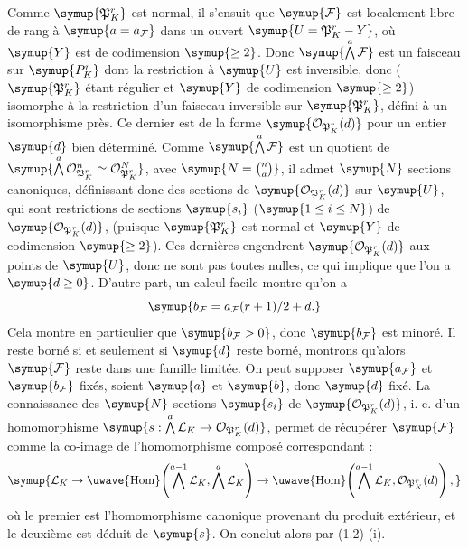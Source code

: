 Comme $\symup{\mathfrak P^r_K}$ est normal, il s'ensuit que $\symup{\mathcal F}$ est localement
libre de rang à $\symup{a=a_{\mathcal F}}$ dans un ouvert
$\symup{U=\mathfrak P^r_K-Y}$, où $\symup{Y}$ est de codimension $\symup{\geq2}$. Donc
$\symup{\mathop{\bigwedge}\limits^{a}\mathcal F}$ est un faisceau sur $\symup{P^r_K}$ dont la restriction
à $\symup{U}$ est inversible, donc ($\symup{\mathfrak P^r_K}$ étant régulier et $\symup{Y}$ de
codimension $\symup{\geq2}$) isomorphe à la restriction d'un faisceau inversible sur
$\symup{\mathfrak P^r_K}$, défini à un isomorphisme près. Ce dernier est de la forme
$\symup{\mathcal O_{\mathfrak P^r_K}(d)}$ pour un entier $\symup{d}$ bien déterminé. Comme
$\symup{\mathop{\bigwedge}\limits^{a}\mathcal F}$ est un quotient de
$\symup{\mathop{\bigwedge}\limits^{a}\mathcal O_{\mathfrak P^r_K}^{n}\simeq
\mathcal O_{\mathfrak P^r_K}^{N}}$, avec $\symup{N=\binom{n}{a}}$, il admet $\symup{N}$ sections
canoniques, définissant donc des sections de
$\symup{\mathcal O_{\mathfrak P^r_K}(d)}$ sur $\symup{U}$, qui sont restrictions de sections
$\symup{s_i}$ ($\symup{1\leq i\leq N}$) de $\symup{\mathcal O_{\mathfrak P^r_K}(d)}$, (puisque
$\symup{\mathfrak P^r_K}$ est normal et $\symup{Y}$ de codimension $\symup{\geq2}$). Ces dernières
engendrent $\symup{\mathcal O_{\mathfrak P^r_K}(d)}$ aux points de $\symup{U}$, donc ne sont pas
toutes nulles, ce qui implique que l'on a $\symup{d\geq0}$. D'autre part, un calcul
facile montre qu'on a
\[
\symup{b_{\mathcal F}=a_{\mathcal F}(r+1)/2+d.}
\]
Cela montre en particulier que $\symup{b_{\mathcal F}>0}$, donc $\symup{b_{\mathcal F}}$ est
minoré. Il reste borné si et seulement si $\symup{d}$ reste borné, montrons qu'alors
$\symup{\mathcal F}$ reste dans une famille limitée. On peut supposer
$\symup{a_{\mathcal F}}$ et $\symup{b_{\mathcal F}}$ fixés, soient $\symup{a}$ et $\symup{b}$, donc $\symup{d}$ fixé.
La connaissance des $\symup{N}$ sections $\symup{s_i}$ de $\symup{\mathcal O_{\mathfrak P^r_K}(d)}$,
i. e. d'un homomorphisme
$\symup{s:\mathop{\bigwedge}\limits^{a}\mathcal L_K\to\mathcal O_{\mathfrak P^r_K}(d)}$, permet de récupérer $\symup{\mathcal F}$ comme la co-image de l'homomorphisme composé
correspondant :
\[
\symup{\mathcal L_K\to
\mathop{\text{\uwave{Hom}}}\nolimits\!\left(\mathop{\bigwedge}\limits^{a-1}\mathcal L_K,
\mathop{\bigwedge}\limits^{a}\mathcal L_K\right)\to
\mathop{\text{\uwave{Hom}}}\nolimits\!\left(\mathop{\bigwedge}\limits^{a-1}\mathcal L_K,
\mathcal O_{\mathfrak P^r_K}(d)\right),}
\]
où le premier est l'homomorphisme canonique provenant du produit extérieur, et
le deuxième est déduit de $\symup{s}$. On conclut alors par (1.2) (i).

